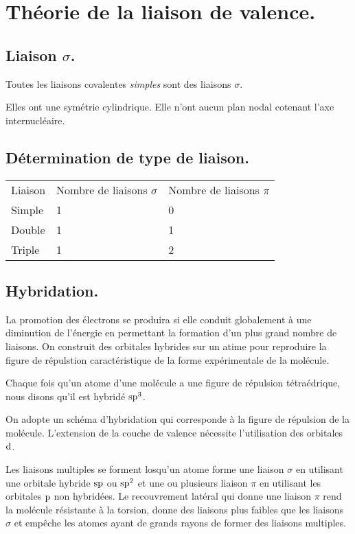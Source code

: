 \documentclass[11pt,a4paper,french]{article}
\begin{document}
\section{Théorie de la liaison de valence.}
\subsection{Liaison $\sigma$.}
Toutes les liaisons covalentes {\it simples} sont des liaisons $\sigma$.

Elles ont une symétrie cylindrique.
Elle n'ont aucun plan nodal cotenant l'axe internucléaire.

\subsection{Détermination de type de liaison.}

\begin{center}
	\begin{tabular}{lll}
		Liaison & Nombre de liaisons $\sigma$ & Nombre de liaisons $\pi$\\
		Simple & 1 & 0\\
		Double & 1 & 1\\
		Triple & 1 & 2\\
	\end{tabular}
\end{center}

\subsection{Hybridation.}

La promotion des électrons se produira si elle conduit globalement à une diminution de l'énergie en permettant la formation d'un plus grand nombre de liaisons. On construit des orbitales hybrides sur un atime pour reproduire la figure de répulstion caractéristique de la forme expérimentale de la molécule.

Chaque fois qu'un atome d'une molécule a une figure de répulsion tétraédrique, nous disons qu'il est hybridé $\mathrm{s}\mathrm{p}^3$.

On adopte un schéma d'hybridation qui corresponde à la figure de répulsion de la molécule. L'extension de la couche de valence nécessite l'utilisation des orbitales $\mathrm{d}$.

Les liaisons multiples se forment losqu'un atome forme une liaison $\sigma$ en utilisant une orbitale hybride $\mathrm{s}\mathrm{p}$ ou $\mathrm{s}\mathrm{p}^2$ et une ou plusieurs liaison $\pi$ en utilisant les orbitales $\mathrm{p}$ non hybridées.
Le recouvrement latéral qui donne une liaison $\pi$ rend la molécule résistante à la torsion, donne des liaisons plus faibles que les liaisons $\sigma$ et empêche les atomes ayant de grands rayons de former des liaisons multiples.
\end{document}
